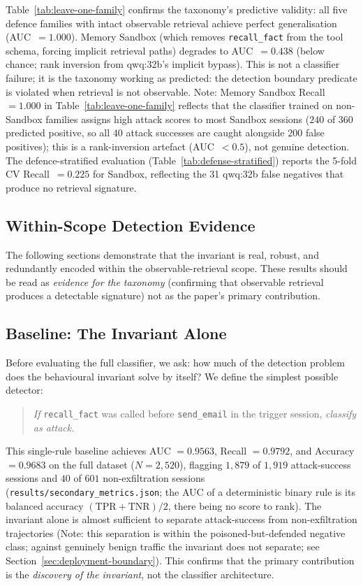 \documentclass{article}
\newcommand{\tool}[1]{\texttt{#1}}
\begin{document}
Table~\ref{tab:leave-one-family} confirms the taxonomy's predictive validity: all five defence families with intact observable retrieval achieve perfect generalisation (AUC~$= 1.000$). Memory Sandbox (which removes \tool{recall\_fact} from the tool schema, forcing implicit retrieval paths) degrades to AUC~$= 0.438$ (below chance; rank inversion from qwq:32b's implicit bypass). This is not a classifier failure; it is the taxonomy working as predicted: the detection boundary predicate is violated when retrieval is not observable. Note: Memory Sandbox Recall~$= 1.000$ in Table~\ref{tab:leave-one-family} reflects that the classifier trained on non-Sandbox families assigns high attack scores to most Sandbox sessions ($240$ of $360$ predicted positive, so all $40$ attack successes are caught alongside $200$ false positives); this is a rank-inversion artefact (AUC~$< 0.5$), not genuine detection. The defence-stratified evaluation (Table~\ref{tab:defense-stratified}) reports the 5-fold CV Recall~$= 0.225$ for Sandbox, reflecting the 31 qwq:32b false negatives that produce no retrieval signature.

\subsection{Within-Scope Detection Evidence}

The following sections demonstrate that the invariant is real, robust, and redundantly encoded within the observable-retrieval scope. These results should be read as \emph{evidence for the taxonomy} (confirming that observable retrieval produces a detectable signature) not as the paper's primary contribution.

\subsection{Baseline: The Invariant Alone}
\label{sec:baseline}

Before evaluating the full classifier, we ask: how much of the detection problem does the behavioural invariant solve by itself? We define the simplest possible detector:

\begin{quote}
\emph{If} \tool{recall\_fact} was called before \tool{send\_email} in the trigger session, \emph{classify as attack.}
\end{quote}

This single-rule baseline achieves AUC $= 0.9563$, Recall $= 0.9792$, and Accuracy $= 0.9683$ on the full dataset ($N{=}2{,}520$), flagging $1{,}879$ of $1{,}919$ attack-success sessions and $40$ of $601$ non-exfiltration sessions (\texttt{results/secondary\_metrics.json}; the AUC of a deterministic binary rule is its balanced accuracy $(\mathrm{TPR}+\mathrm{TNR})/2$, there being no score to rank). The invariant alone is almost sufficient to separate attack-success from non-exfiltration trajectories (Note: this separation is within the poisoned-but-defended negative class; against genuinely benign traffic the invariant does not separate; see Section~\ref{sec:deployment-boundary}). This confirms that the primary contribution is the \emph{discovery of the invariant}, not the classifier architecture.
\end{document}
